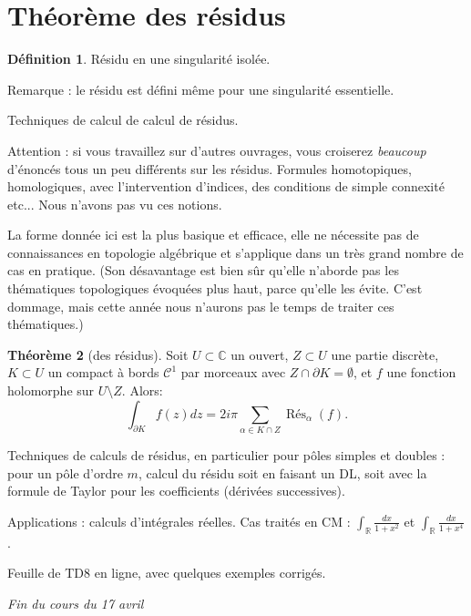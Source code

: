 \documentclass[11pt,a4paper]{book}
\newcommand{\R}{\mathbb{R}}
\newcommand{\C}{\mathbb{C}}
\theoremstyle{definition}
\newtheorem{theoreme}{Th\'eor\`eme}[section]
\newtheorem{definition}[theoreme]{D\'efinition}
\theoremstyle{plain}
\begin{document}


\section{Théorème des résidus}

\begin{definition}
Résidu en une singularité isolée.
\end{definition}

Remarque : le résidu est défini même pour une singularité essentielle.

Techniques de calcul de calcul de résidus.

Attention : si vous travaillez sur d'autres ouvrages, vous croiserez \emph{beaucoup} d'énoncés tous un peu différents sur les résidus. Formules homotopiques, homologiques, avec l'intervention d'indices, des conditions de simple connexité  etc... Nous n'avons pas vu ces notions. 

La forme donnée ici est la plus basique et efficace, elle ne nécessite pas de connaissances en topologie algébrique et s'applique dans un très grand nombre de cas en pratique. 
(Son désavantage est bien sûr qu'elle n'aborde pas les thématiques topologiques évoquées plus haut, parce qu'elle les évite. C'est dommage, mais cette année nous n'aurons pas le temps de traiter ces thématiques.)

\begin{theoreme}[des résidus]
Soit $U\subset \C$ un ouvert, $Z\subset U$ une partie discrète, $K\subset U$ un compact à bords $\mathcal C^1$ par morceaux avec $Z\cap \partial K = \emptyset$, et $f$ une fonction holomorphe sur $U\setminus Z$.
Alors:
\[ \int_{\partial K} f(z)dz = 2i\pi \sum_{\alpha \in K\cap Z} \operatorname{Rés}_\alpha(f).\]
\end{theoreme}

Techniques de calculs de résidus, en particulier pour pôles simples et doubles : pour un pôle d'ordre $m$, calcul du résidu soit en faisant un DL, soit avec la formule de Taylor pour les coefficients (dérivées successives).


Applications : calculs d'intégrales réelles. Cas traités en CM : $\int_\R \frac{dx}{1+x^2}$ et $\int_\R \frac{dx}{1+x^4}$.

Feuille de TD8 en ligne, avec quelques exemples corrigés.

\begin{center}
\hrulefill \emph{Fin du cours du 17 avril} \hrulefill
\end{center}
\end{document}
